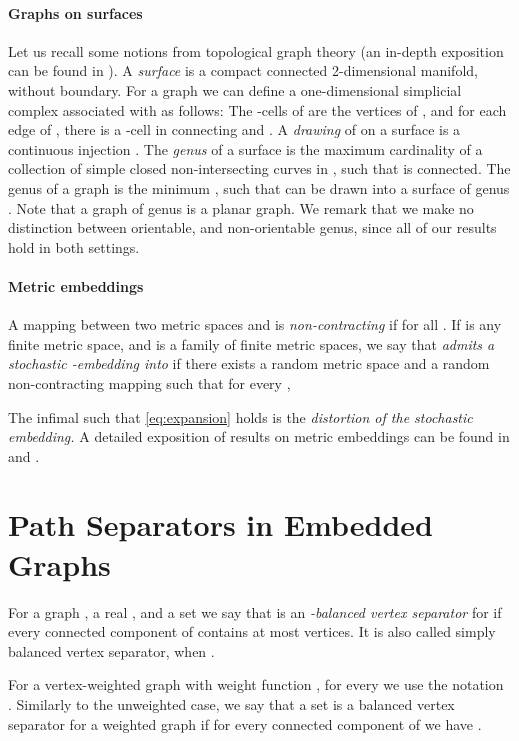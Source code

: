 \documentclass[envcountsect]{llncs}
\begin{document}
\paragraph{Graphs on surfaces}
Let us recall some notions from topological graph theory (an in-depth
exposition can be found in \cite{MoharT-book}).  A \emph{surface} is a
compact connected 2-dimensional manifold, without boundary.
For a graph  we can
define a one-dimensional simplicial complex  associated with  as
follows: The -cells of  are the vertices of , and for each
edge  of , there is a -cell in  connecting  and
.  A \emph{drawing} of  on a surface  is a continuous injection
.
The \emph{genus} of a surface  is the maximum cardinality of a collection
of simple closed non-intersecting curves  in , such that  is connected.
The genus of a graph  is the minimum , such that  can be drawn into a surface of genus .
Note that a graph of genus  is a planar graph.
We remark that we make no distinction between orientable, and non-orientable genus, since all of our results hold in both settings.

\paragraph{Metric embeddings}
A mapping  between two metric spaces  and 
is {\em non-contracting} if  for all .
If  is any finite metric space, and 
is a family of finite metric spaces, we say that {\em  admits a stochastic -embedding into } if there exists a random metric space  and a random
non-contracting mapping  such that for every ,

The infimal  such that \eqref{eq:expansion} holds is the {\em distortion of
the stochastic embedding.}
A detailed exposition of  results on metric embeddings can be found in \cite{I-survey} and \cite{Matousek-book}.




\section{Path Separators in Embedded Graphs}

For a graph , a real , and a set  we say that  is an \emph{-balanced vertex separator} for  if every connected component of  contains at most  vertices.
It is also called simply balanced vertex separator, when .

For a vertex-weighted graph  with weight function , for every  we use the notation .
Similarly to the unweighted case, we say that a set  is a balanced vertex separator for a weighted graph
  if for every connected component  of  we have . 
\end{document}
